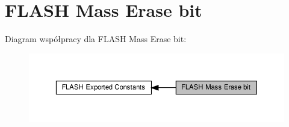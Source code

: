 \hypertarget{group___f_l_a_s_h_ex___mass_erase__bit}{}\section{F\+L\+A\+SH Mass Erase bit}
\label{group___f_l_a_s_h_ex___mass_erase__bit}
Diagram współpracy dla F\+L\+A\+SH Mass Erase bit\+:\nopagebreak
\begin{figure}[H]
\begin{center}
\leavevmode
\includegraphics[width=350pt]{group___f_l_a_s_h_ex___mass_erase__bit}
\end{center}
\end{figure}
